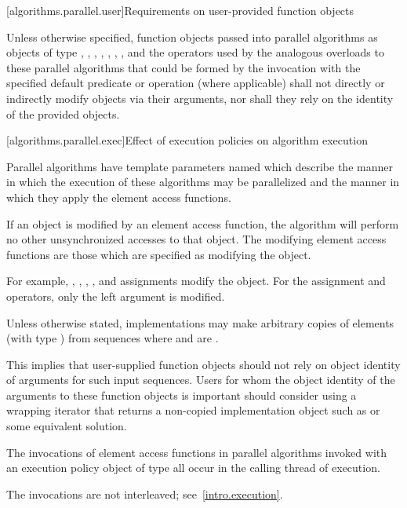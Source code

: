 [algorithms.parallel.user]{Requirements on user-provided function objects}

\pnum
Unless otherwise specified,
function objects passed into parallel algorithms as objects of type
,
,
,
,
,
,
, and
the operators used by the analogous overloads to these parallel algorithms
that could be formed by the invocation
with the specified default predicate or operation (where applicable)
shall not directly or indirectly modify objects via their arguments,
nor shall they rely on the identity of the provided objects.

[algorithms.parallel.exec]{Effect of execution policies on algorithm execution}

\pnum
Parallel algorithms have
template parameters named 
which describe the manner in which the execution of these algorithms may be
parallelized and the manner in which they apply the element access functions.

\pnum
If an object is modified by an element access function,
the algorithm will perform no other unsynchronized accesses to that object.
The modifying element access functions are those
which are specified as modifying the object.
\begin{note}
For example,
,
\tcode{++},
\tcode{--},
, and
assignments
modify the object.
For the assignment and  operators, only the left argument is modified.
\end{note}

\pnum
Unless otherwise stated, implementations may make arbitrary copies of elements
(with type ) from sequences
where 
and  are .
\begin{note}
This implies that user-supplied function objects should not rely on
object identity of arguments for such input sequences.
Users for whom the object identity of the arguments to these function objects
is important should consider using a wrapping iterator
that returns a non-copied implementation object
such as 
or some equivalent solution.
\end{note}

\pnum
The invocations of element access functions in parallel algorithms invoked with
an execution policy object of type  all occur
in the calling thread of execution.
\begin{note}
The invocations are not interleaved; see~\ref{intro.execution}.
\end{note}

